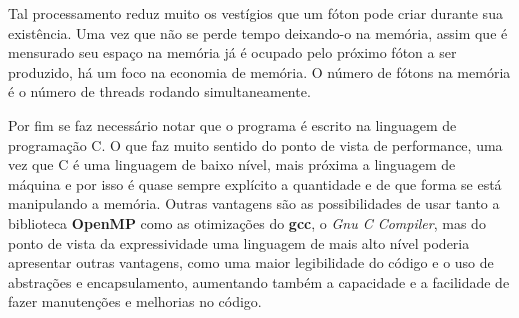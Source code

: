   Tal processamento reduz muito os vestígios que um fóton pode criar durante sua existência. Uma vez que não se perde tempo deixando-o na memória, assim que é mensurado seu espaço na memória já é ocupado pelo próximo fóton a ser produzido, há um foco na economia de memória. O número de fótons na memória é o número de threads rodando simultaneamente.

  Por fim se faz necessário notar que o programa é escrito na linguagem de programação C. O que faz muito sentido do ponto de vista de performance, uma vez que C é uma linguagem de baixo nível, mais próxima a linguagem de máquina e por isso é quase sempre explícito a quantidade e de que forma se está manipulando a memória. Outras vantagens são as possibilidades de usar tanto a biblioteca \textbf{OpenMP} como as otimizações do \textbf{gcc}, o \textit{Gnu C Compiler}, mas do ponto de vista da expressividade uma linguagem de mais alto nível poderia apresentar outras vantagens, como uma maior legibilidade do código e o uso de abstrações e encapsulamento, aumentando também a capacidade e a facilidade de fazer manutenções e melhorias no código.
